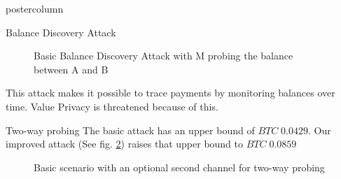 \documentclass{beamer}
\begin{document}
\begin{frame}
\begin{columns}
\begin{column}{.5\textwidth}
\begin{beamercolorbox}[center]{postercolumn}
\begin{minipage}{.98\textwidth}
{\begin{myblock}{Balance Discovery Attack}
\begin{figure}
\begin{minipage}{0.94\textwidth}
                    \caption{Basic Balance Discovery Attack with M probing the balance between A and B}
                    \label{fig:basic}
                  \end{minipage}
                \end{figure}
                This attack makes it possible to trace payments by monitoring balances over time. Value Privacy is threatened because of this.
              \end{myblock}
              \begin{myblock}{Two-way probing}
                The basic attack has an upper bound of $BTC\;0.0429$. Our improved attack (See fig. \ref{fig:twoway}) raises that upper bound to $BTC\;0.0859$
                \begin{figure}
                  \begin{minipage}{0.94\textwidth}
                    \centering
                    \caption{Basic scenario with an optional second channel for two-way probing}
                    \label{fig:twoway}
                  \end{minipage}
                \end{figure}
              \end{myblock}\vfill
        }\end{minipage}\end{beamercolorbox}
    \end{column}

\end{columns}
\end{frame}
\end{document}

